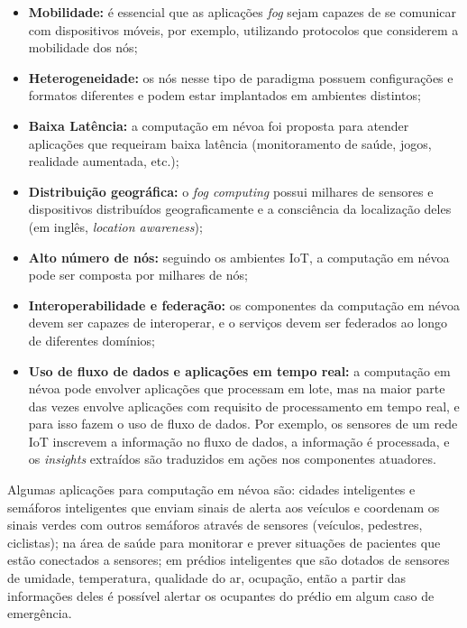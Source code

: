 \begin{itemize}

    \item \textbf{Mobilidade:} é essencial que as aplicações \emph{fog} sejam
    capazes de se comunicar com dispositivos móveis, por exemplo, utilizando
    protocolos que considerem a mobilidade dos nós;

    \item \textbf{Heterogeneidade:} os nós nesse tipo de paradigma possuem
    configurações e formatos diferentes e podem estar implantados em ambientes
    distintos;

    \item \textbf{Baixa Latência:} a computação em névoa foi proposta para
    atender aplicações que requeiram baixa latência (monitoramento de saúde,
    jogos, realidade aumentada, etc.);

    \item \textbf{Distribuição geográfica:} o \emph{fog computing} possui
    milhares de sensores e dispositivos distribuídos geograficamente e a
    consciência da localização deles (em inglês, \emph{location awareness});

    \item \textbf{Alto número de nós:} seguindo os ambientes IoT, a computação
    em névoa pode ser composta por milhares de nós;

    \item \textbf{Interoperabilidade e federação:} os componentes da computação
    em névoa devem ser capazes de interoperar, e o serviços devem ser federados
    ao longo de diferentes domínios;

    \item \textbf{Uso de fluxo de dados e aplicações em tempo real:} a
    computação em névoa pode envolver aplicações que processam em lote, mas na
    maior parte das vezes envolve aplicações com requisito de processamento em
    tempo real, e para isso fazem o uso de fluxo de dados. Por exemplo, os
    sensores de um rede IoT inscrevem a informação no fluxo de dados, a
    informação é processada, e os \emph{insights} extraídos são traduzidos em
    ações nos componentes atuadores.

\end{itemize}

Algumas aplicações para computação em névoa são: cidades inteligentes e
semáforos inteligentes que enviam sinais de alerta aos veículos e coordenam os
sinais verdes com outros semáforos através de sensores (veículos, pedestres,
ciclistas); na área de saúde para monitorar e prever situações de pacientes que
estão conectados a sensores; em prédios inteligentes que são dotados de sensores
de umidade, temperatura, qualidade do ar, ocupação, então a partir das
informações deles é possível alertar os ocupantes do prédio em algum caso de
emergência.

